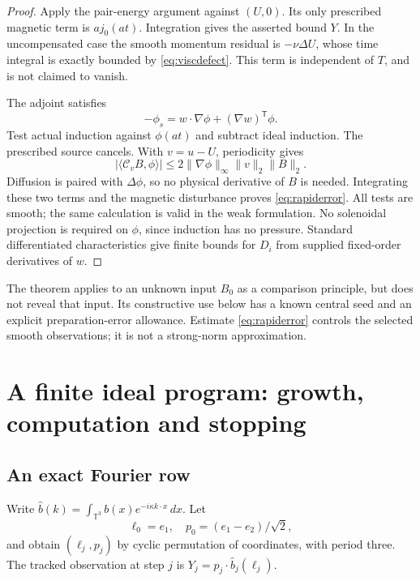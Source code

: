 \documentclass[11pt,a4paper]{amsart}
\theoremstyle{definition}
\theoremstyle{remark}
\numberwithin{equation}{section}
\newcommand{\T}{\mathbb T}
\newcommand{\Ccal}{\mathcal C}
\newcommand{\ip}[2]{\langle #1,#2\rangle}
\newcommand{\norm}[1]{\lVert #1\rVert}
\newcommand{\abs}[1]{\lvert #1\rvert}
\begin{document}
\begin{proof}
Apply the pair-energy argument against $(U,0)$. Its only prescribed magnetic term is $a j_0(at)$. Integration gives the asserted bound $Y$. In the uncompensated case the smooth momentum residual is $-\nu\Delta U$, whose time integral is exactly bounded by \eqref{eq:viscdefect}. This term is independent of $T$, and is not claimed to vanish.

The adjoint satisfies
\[
 -\phi_s=w\cdot\nabla\phi+(\nabla w)^\mathsf T\phi.
\]
Test actual induction against $\phi(at)$ and subtract ideal induction. The prescribed source cancels. With $v=u-U$, periodicity gives
\begin{equation}\label{eq:weakbracket}
 \abs{\ip{\Ccal_vB}\phi}
 \le2\norm{\nabla\phi}_\infty\norm v_2\norm B_2.
\end{equation}
Diffusion is paired with $\Delta\phi$, so no physical derivative of $B$ is needed. Integrating these two terms and the magnetic disturbance proves \eqref{eq:rapiderror}. All tests are smooth; the same calculation is valid in the weak formulation. No solenoidal projection is required on $\phi$, since induction has no pressure. Standard differentiated characteristics give finite bounds for $D_i$ from supplied fixed-order derivatives of $w$.
\end{proof}

The theorem applies to an unknown input $B_0$ as a comparison principle, but does not reveal that input. Its constructive use below has a known central seed and an explicit preparation-error allowance. Estimate \eqref{eq:rapiderror} controls the selected smooth observations; it is not a strong-norm approximation.



\section{A finite ideal program: growth, computation and stopping}\label{sec:ideal}

\subsection{An exact Fourier row}
Write $\widehat b(k)=\int_{\T^3}b(x)e^{-i\kappa k\cdot x}\,dx$. Let
\[
 \ell_0=e_1,\quad p_0=(e_1-e_2)/\sqrt2,
\]
and obtain $(\ell_j,p_j)$ by cyclic permutation of coordinates, with period three. The tracked observation at step $j$ is $Y_j=p_j\cdot\widehat b_j(\ell_j)$.
\end{document}
